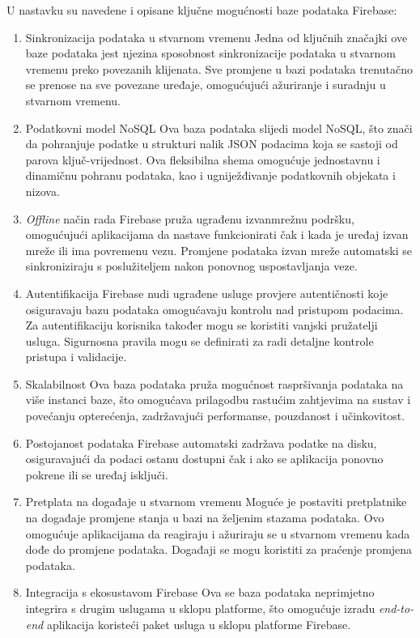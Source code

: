 U nastavku su navedene i opisane ključne mogućnosti baze podataka Firebase:
\begin{enumerate}
	\item Sinkronizacija podataka u stvarnom vremenu
	\subitem Jedna od ključnih značajki ove baze podataka jest njezina sposobnost sinkronizacije podataka u stvarnom vremenu preko povezanih klijenata. Sve promjene u bazi podataka trenutačno se prenose na sve povezane uređaje, omogućujući ažuriranje i suradnju u stvarnom vremenu.
	\item Podatkovni model NoSQL
	\subitem Ova baza podataka slijedi model NoSQL, što znači da pohranjuje podatke u strukturi nalik JSON podacima koja se sastoji od parova ključ-vrijednost. Ova fleksibilna shema omogućuje jednostavnu i dinamičnu pohranu podataka, kao i ugniježđivanje podatkovnih objekata i nizova.
	\item \textit{Offline} način rada
	\subitem Firebase pruža ugrađenu izvanmrežnu podršku, omogućujući aplikacijama da nastave funkcionirati čak i kada je uređaj izvan mreže ili ima povremenu vezu. Promjene podataka izvan mreže automatski se sinkroniziraju s poslužiteljem nakon ponovnog uspostavljanja veze.
	\item Autentifikacija
	\subitem Firebase nudi ugrađene usluge provjere autentičnosti koje osiguravaju bazu podataka omogućavaju kontrolu nad pristupom podacima. Za autentifikaciju korisnika također mogu se koristiti vanjski pružatelji usluga. Sigurnosna pravila mogu se definirati za radi detaljne kontrole pristupa i validacije. 
	\item Skalabilnost
	\subitem Ova baza podataka pruža mogućnost raspršivanja podataka na više instanci baze, što omogućava prilagodbu rastućim zahtjevima na sustav i povećanju opterećenja, zadržavajući performanse, pouzdanost i učinkovitost.
	\item Postojanost podataka
	\subitem Firebase automatski zadržava podatke na disku, osiguravajući da podaci ostanu dostupni čak i ako se aplikacija ponovno pokrene ili se uređaj isključi.
	\item Pretplata na događaje u stvarnom vremenu
	\subitem Moguće je postaviti pretplatnike na događaje promjene stanja u bazi na željenim stazama podataka. Ovo omogućuje aplikacijama da reagiraju i ažuriraju se u stvarnom vremenu kada dođe do promjene podataka. Događaji se mogu koristiti za praćenje promjena podataka.
	\item Integracija s ekosustavom Firebase
	\subitem Ova se baza podataka neprimjetno integrira s drugim uslugama u sklopu platforme, što omogućuje izradu \textit{end-to-end} aplikacija koristeći paket usluga u sklopu platforme Firebase.
\end{enumerate}

